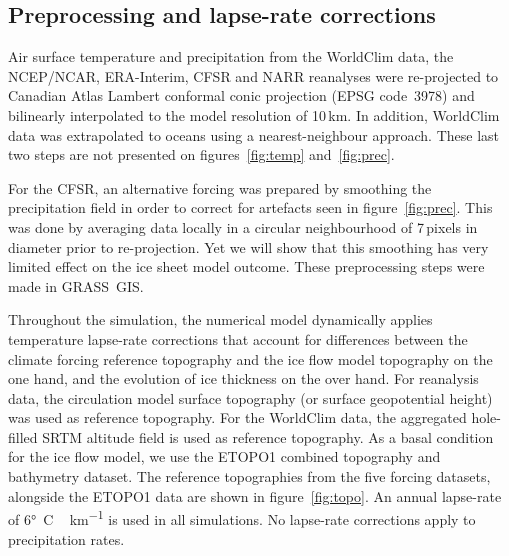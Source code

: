 
\subsection{Preprocessing and lapse-rate corrections}

Air surface temperature and precipitation from the WorldClim data, the NCEP/NCAR, ERA-Interim, CFSR and NARR reanalyses were re-projected to Canadian Atlas Lambert conformal conic projection (EPSG code~3978) and bilinearly interpolated to the model resolution of 10\,km. In addition, WorldClim data was extrapolated to oceans using a nearest-neighbour approach. These last two steps are not presented on figures~\ref{fig:temp} and~\ref{fig:prec}.

For the CFSR, an alternative forcing was prepared by smoothing the precipitation field in order to correct for artefacts seen in figure~\ref{fig:prec}. This was done by averaging data locally in a circular neighbourhood of 7\,pixels in diameter prior to re-projection. Yet we will show that this smoothing has very limited effect on the ice sheet model outcome. These preprocessing steps were made in GRASS~GIS.

Throughout the simulation, the numerical model dynamically applies temperature lapse-rate corrections that account for differences between the climate forcing reference topography and the ice flow model topography on the one hand, and the evolution of ice thickness on the over hand. For reanalysis data, the circulation model surface topography (or surface geopotential height) was used as reference topography. For the WorldClim data, the aggregated hole-filled SRTM altitude field is used as reference topography. As a basal condition for the ice flow model, we use the ETOPO1\citep{data:etopo1} combined topography and bathymetry dataset. The reference topographies from the five forcing datasets, alongside the ETOPO1 data are shown in figure~\ref{fig:topo}. An annual lapse-rate of 6\unit{\degree C\,km^{-1}} is used in all simulations. No lapse-rate corrections apply to precipitation rates.

